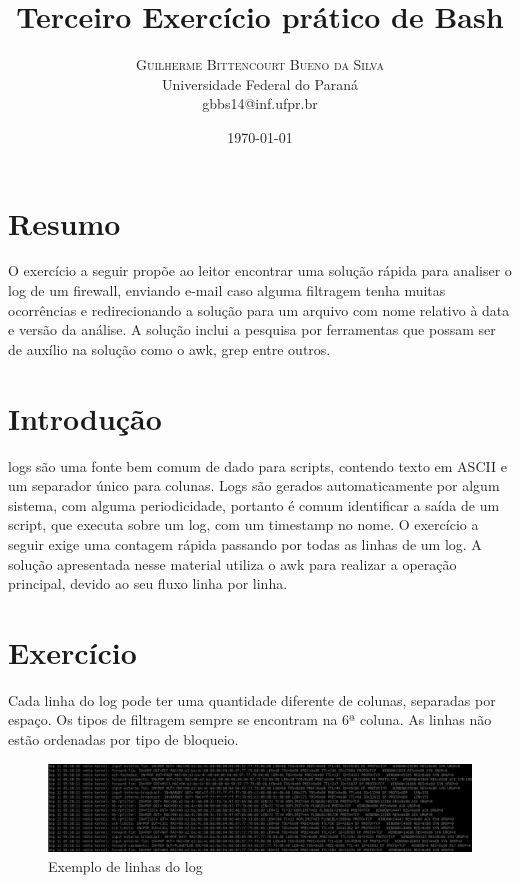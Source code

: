 \documentclass[oneside, 11 pt]{article}
\title{Terceiro Exercício prático de Bash} %
\author{%
	\textsc{Guilherme Bittencourt Bueno da Silva} \\[1ex] %
	\normalsize Universidade Federal do Paraná \\ %
	\normalsize {gbbs14@inf.ufpr.br} %
}
\date{\today} %
\begin{document}
	
	\maketitle
	
	\section{Resumo}
	O exercício a seguir propõe ao leitor encontrar uma solução rápida para analiser o log de um firewall, enviando e-mail caso alguma filtragem tenha muitas ocorrências e redirecionando a solução para um arquivo com nome relativo à data e versão da análise. A solução inclui a pesquisa por ferramentas que possam ser de auxílio na solução como o awk, grep entre outros.
	
	\section{Introdução}
	logs são uma fonte bem comum de dado para scripts, contendo texto em ASCII e um separador único para colunas. Logs são gerados automaticamente por algum sistema, com alguma periodicidade, portanto é comum identificar a saída de um script, que executa sobre um log, com um timestamp no nome.  O exercício a seguir exige uma contagem rápida passando por todas as linhas de um log. A solução apresentada nesse material utiliza o awk para realizar a operação principal, devido ao seu fluxo linha por linha.
	
	\section{Exercício}
	Cada linha do log pode ter uma quantidade diferente de colunas, separadas por espaço. Os tipos de filtragem sempre se encontram na 6ª coluna. As linhas não estão ordenadas por tipo de bloqueio.
	
	\begin{figure}[h]
		\includegraphics[width=\linewidth]{loglines.png}
		\caption{Exemplo de linhas do log}
		\label{fig:loglines}
	\end{figure}
\end{document}
